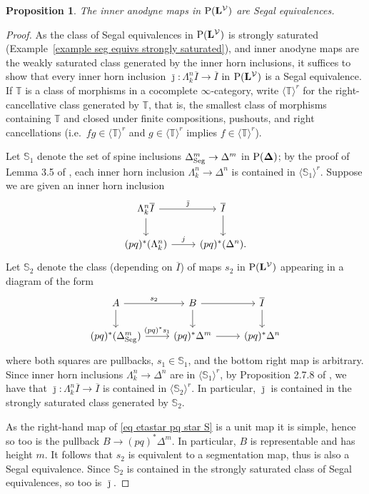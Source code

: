 \documentclass{amsart}
\numberwithin{theorem}{subsection}
\newtheorem{propn}[theorem]{Proposition}
\theoremstyle{definition}
\newcommand{\xV}{\mathcal{V}}
\newcommand{\olI}{\overline{I}}
\newcommand{\Pre}{\name{P}}
\newcommand{\name}[1]{\ensuremath{\text{\textup{#1}}}}
\newcommand{\simp}{\mathbf{\Delta}}
\newcommand{\levelg}{\mathbf{L}}
\newcommand{\levelV}{\levelg^\xV}
\newcommand{\Seg}{\name{Seg}}
\begin{document}
\begin{propn}\label{propn:iaDFV}
	The inner anodyne maps in $\Pre(\levelV)$ are Segal equivalences.
\end{propn}
\begin{proof}
As the class of Segal equivalences in $\Pre(\levelV)$ is strongly saturated (Example~\ref{example seg equivs strongly saturated}), and inner anodyne maps are the weakly saturated class generated by the inner horn inclusions, it suffices to show that every inner horn inclusion $\bar \jmath \colon \Lambda^{n}_{k}\olI\to \olI$ in $\Pre(\levelV)$ is a Segal equivalence.
If $\mathbb{T}$ is a class of morphisms in a cocomplete $\infty$-category, write $\langle \mathbb{T} \rangle^r$ for the right-cancellative class generated by $\mathbb{T}$, that is, the smallest class of morphisms containing $\mathbb{T}$ and closed under finite compositions, pushouts, and right cancellations (i.e.\ $fg\in \langle \mathbb{T} \rangle^r$ and $g\in \langle \mathbb{T} \rangle^r$ implies $f\in \langle \mathbb{T} \rangle^r$).

Let $\mathbb{S}_1$ denote the set of spine inclusions $\Delta^m_\Seg\to \Delta^m$ in $\Pre(\simp)$; by the proof of Lemma 3.5 of \cite{JoyalTierney}, each inner horn inclusion $\Lambda_k^n \to \Delta^n$ is contained in $\langle \mathbb{S}_1 \rangle^r$.
Suppose we are given an inner horn inclusion 
\[ \begin{tikzcd}
\Lambda^{n}_{k}\olI \rar{\bar\jmath} \dar & \olI \dar \\
(pq)^*(\Lambda^{n}_{k}) \rar{j} & (pq)^*(\Delta^n).
\end{tikzcd} \]
Let $\mathbb{S}_2$ denote the class (depending on $\olI$) of maps $s_2$ in $\Pre(\levelV)$ appearing in a diagram of the form
\begin{equation}\label{eq etastar pq star S}
\begin{tikzcd}
A \rar{s_2} \dar & B \rar \dar & \olI \dar \\
(pq)^*(\Delta^m_\Seg) \rar{(pq)^*s_1} & (pq)^*\Delta^m \rar & (pq)^* \Delta^n
\end{tikzcd} \end{equation}
where both squares are pullbacks, $s_1 \in \mathbb{S}_1$, and the bottom right map is arbitrary.
Since inner horn inclusions $\Lambda^n_k \to \Delta^n$ are in $\langle \mathbb{S}_1 \rangle^r$, 
by Proposition 2.7.8 of \cite{ChuHaugseng}, we have that $\bar \jmath \colon \Lambda^{n}_{k}\olI\to \olI$ is contained in $\langle \mathbb{S}_2 \rangle^r$.
In particular, $\bar \jmath$ is contained in the strongly saturated class generated by $\mathbb{S}_2$.

As the right-hand map of \eqref{eq etastar pq star S} is a unit map it is simple, hence so too is the pullback $B \to (pq)^*\Delta^m$.
In particular, $B$ is representable and has height $m$.
It follows that $s_2$ is equivalent to a segmentation map, thus is also a Segal equivalence.
Since $\mathbb{S}_2$ is contained in the strongly saturated class of Segal equivalences, so too is $\bar \jmath$.
\end{proof}
\end{document}
